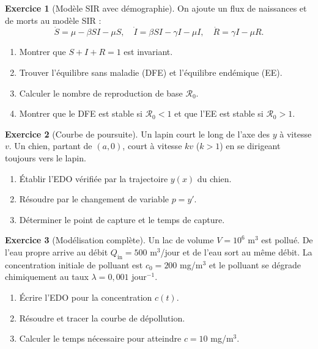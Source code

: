 \documentclass[12pt,a4paper,openany]{book}
\theoremstyle{definition}
\newtheorem{exercice}{Exercice}[chapter]
\theoremstyle{plain}
\theoremstyle{remark}
\begin{document}
\begin{exercice}[Modèle SIR avec démographie]
\label{exo:SIR-demo}
On ajoute un flux de naissances et de morts au modèle SIR :
\[
\dot{S} = \mu - \beta SI - \mu S, \quad
\dot{I} = \beta SI - \gamma I - \mu I, \quad
\dot{R} = \gamma I - \mu R.
\]
\begin{enumerate}[label=\alph*)]
  \item Montrer que $S + I + R = 1$ est invariant.
  \item Trouver l'équilibre sans maladie (DFE) et l'équilibre
        endémique (EE).
  \item Calculer le nombre de reproduction de base $\mathcal{R}_0$.
  \item Montrer que le DFE est stable si $\mathcal{R}_0 < 1$ et
        que l'EE est stable si $\mathcal{R}_0 > 1$.
\end{enumerate}
\end{exercice}

\begin{exercice}[Courbe de poursuite]
\label{exo:poursuite}
Un lapin court le long de l'axe des $y$ à vitesse $v$. Un chien,
partant de $(a, 0)$, court à vitesse $kv$ ($k > 1$) en se dirigeant
toujours vers le lapin.
\begin{enumerate}[label=\alph*)]
  \item Établir l'EDO vérifiée par la trajectoire $y(x)$ du chien.
  \item Résoudre par le changement de variable $p = y'$.
  \item Déterminer le point de capture et le temps de capture.
\end{enumerate}
\end{exercice}

\begin{exercice}[Modélisation complète]
\label{exo:modelisation}
Un lac de volume $V = 10^6$ m$^3$ est pollué. De l'eau propre
arrive au débit $Q_{\text{in}} = 500$ m$^3$/jour et de l'eau sort au
même débit. La concentration initiale de polluant est $c_0 = 200$
mg/m$^3$ et le polluant se dégrade chimiquement au taux
$\lambda = 0{,}001$ jour$^{-1}$.
\begin{enumerate}[label=\alph*)]
  \item Écrire l'EDO pour la concentration $c(t)$.
  \item Résoudre et tracer la courbe de dépollution.
  \item Calculer le temps nécessaire pour atteindre $c = 10$ mg/m$^3$.
\end{enumerate}
\end{exercice}
\end{document}
